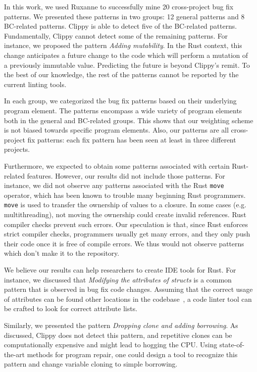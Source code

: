 In this work, we used Ruxanne to successfully mine 20 cross-project bug fix patterns. We presented these patterns in two groups: 12 general patterns and 8 BC-related patterns. Clippy is able to detect five of the BC-related patterns. Fundamentally, Clippy cannot detect some of the remaining patterns. For instance, we proposed the pattern \textit{Adding mutability}. In the Rust context, this change anticipates a future change to the code which will perform a mutation of a previously immutable value. Predicting the future is beyond Clippy's remit. To the best of our knowledge, the rest of the patterns cannot be reported by the current linting tools. 

In each group, we categorized the bug fix patterns based on their underlying program element. The patterns encompass a wide variety of program elements both in the general and BC-related groups. This shows that our weighting scheme is not biased towards specific program elements. Also, our patterns are all cross-project fix patterns: each fix pattern has been seen at least in three different projects.

Furthermore, we expected to obtain some patterns associated with certain Rust-related features. However, our results did not include those patterns. For instance, we did not observe any patterns associated with the Rust \verb+move+ operator, which has been known to trouble many beginning Rust programmers. \verb+move+ is used to transfer the ownership of values to a closure. In some cases (e.g. multithreading), not moving the ownership could create invalid references. Rust compiler checks prevent such errors. Our speculation is that, since Rust enforces strict compiler checks, programmers usually get many errors, and they only push their code once it is free of compile errors. We thus would not observe patterns which don't make it to the repository.

We believe our results can help researchers to create IDE tools for Rust. For instance, we discussed that \textit{Modifying the attributes of structs} is a common pattern that is observed in bug fix code changes. Assuming that the correct usage of attributes can be found other locations in the codebase~\citep{forrest2009genetic}, a code linter tool can be crafted to look for correct attribute lists.

Similarly, we presented the pattern \textit{Dropping clone and adding borrowing}. As discussed, Clippy does not detect this pattern, and repetitive clones can be computationally expensive and might lead to hogging the CPU. Using state-of-the-art methods for program repair, one could design a tool to recognize this pattern and change variable cloning to simple borrowing.

